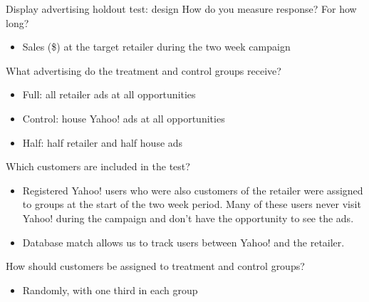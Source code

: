 \documentclass[10pt, aspectratio=169]{beamer}
\begin{document}
\begin{frame}{Display advertising holdout test: design}
How do you measure response? For how long?
\begin{itemize}
\item Sales (\$) at the target retailer during the two week campaign 
\end{itemize}
\pause
What advertising do the treatment and control groups receive?\\
\begin{itemize}
\item \alert{Full}: all retailer ads at all opportunities
\item \alert{Control}: house Yahoo! ads at all opportunities
\item \alert{Half}: half retailer and half house ads
\end{itemize}
\pause
Which customers are included in the test?\\
\begin{itemize}
\item Registered Yahoo! users who were also customers of the retailer were assigned to groups at the start of the two week period. Many of these users never visit Yahoo! during the campaign and don't have the opportunity to see the ads. 
\item Database match allows us to track users between Yahoo! and the retailer.
\end{itemize}
\pause
How should customers be assigned to treatment and control groups? \\
\begin{itemize}
\item Randomly, with one third in each group
\end{itemize}
\end{frame}
\end{document}
